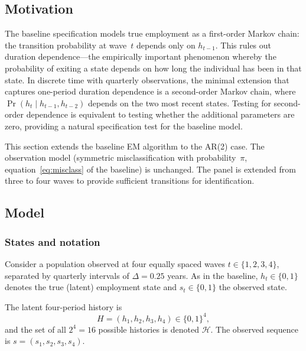 

\subsection{Motivation}

The baseline specification models true employment as a first-order
Markov chain: the transition probability at wave~$t$ depends only on
$h_{t-1}$. This rules out duration dependence---the empirically
important phenomenon whereby the probability of exiting a state depends
on how long the individual has been in that state. In discrete time with
quarterly observations, the minimal extension that captures
one-period duration dependence is a second-order Markov chain, where
$\Pr(h_t \mid h_{t-1}, h_{t-2})$ depends on the two most recent states.
Testing for second-order dependence is equivalent to testing whether the
additional parameters are zero, providing a natural specification test
for the baseline model.

This section extends the baseline EM algorithm to the AR(2) case. The
observation model (symmetric misclassification with probability~$\pi$,
equation~\eqref{eq:misclass} of the baseline) is unchanged. The panel
is extended from three to four waves to provide sufficient transitions
for identification.

\subsection{Model}

\subsubsection{States and notation}

Consider a population observed at four equally spaced waves
$t \in \{1, 2, 3, 4\}$, separated by quarterly intervals of
$\Delta = 0.25$ years. As in the baseline, $h_t \in \{0,1\}$ denotes
the true (latent) employment state and $s_t \in \{0,1\}$ the observed
state.

The latent four-period history is
\[
H = (h_1, h_2, h_3, h_4) \in \{0,1\}^4,
\]
and the set of all $2^4 = 16$ possible histories is denoted
$\mathcal{H}$. The observed sequence is
$s = (s_1, s_2, s_3, s_4)$.

